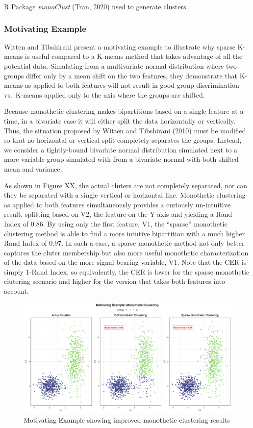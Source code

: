 \documentclass[
]{article}
\begin{document}
R Package \emph{monoClust} (Tran, 2020) used to generate clusters.

\hypertarget{motivating-example}{%
\subsubsection{Motivating Example}\label{motivating-example}}

Witten and Tibshirani present a motivating example to illustrate why
sparse K-means is useful compared to a K-means method that takes
advantage of all the potential data. Simulating from a multivariate
normal distribution where two groups differ only by a mean shift on the
two features, they demonstrate that K-means as applied to both features
will not result in good group discrimination vs.~K-means applied only to
the axis where the groups are shifted.

Because monothetic clustering makes bipartitions based on a single
feature at a time, in a bivariate case it will either split the data
horizontally or vertically. Thus, the situation proposed by Witten and
Tibshirani (2010) must be modified so that no horizontal or vertical
split completely separates the groups. Instead, we consider a
tightly-bound bivariate normal distribution simulated next to a more
variable group simulated with from a bivariate normal with both shifted
mean and variance.

As shown in Figure XX, the actual cluters are not completely separated,
nor can they be separated with a single vertical or horizontal line.
Monothetic clustering as applied to both features simultaneously
provides a curiously un-intuitive result, splitting based on V2, the
feature on the Y-axis and yielding a Rand Index of 0.86. By using only
the first feature, V1, the ``sparse'' monothetic clustering method is
able to find a more intutive bipartition with a much higher Rand Index
of 0.97. In such a case, a sparse monothetic method not only better
captures the cluter membership but also more useful monothetic
characterization of the data based on the more signal-bearing variable,
V1. Note that the CER is simply 1-Rand Index, so equivalently, the CER
is lower for the sparse monothetic clutering scenario and higher for the
version that takes both features into account.

\begin{figure}
\includegraphics[width=0.9\linewidth]{SparseMotivatingExample} \caption{Motivating Example showing improved monothetic clustering results}\label{fig:MotivatingExample}
\end{figure}
\end{document}
